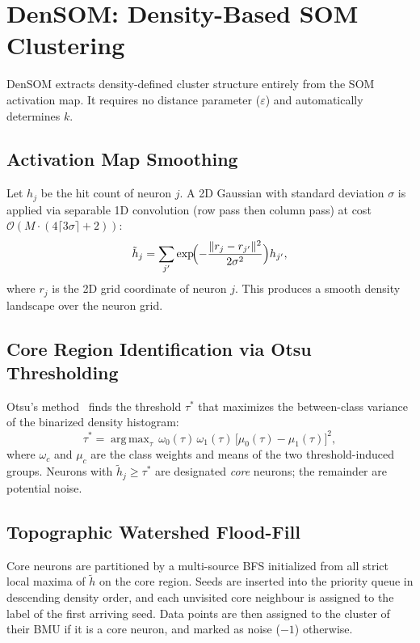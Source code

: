 \documentclass[journal]{IEEEtran}
\DeclareMathOperator*{\argmax}{arg\,max}
\begin{document}
\section{DenSOM: Density-Based SOM Clustering}
\label{sec:densom}

DenSOM extracts density-defined cluster structure entirely from the SOM activation map. It requires no distance parameter ($\varepsilon$) and automatically determines $k$.

\subsection{Activation Map Smoothing}

Let $h_j$ be the hit count of neuron $j$. A 2D Gaussian with standard deviation $\sigma$ is applied via separable 1D convolution (row pass then column pass) at cost $\mathcal{O}(M \cdot (4\lceil 3\sigma \rceil + 2))$:
\begin{equation}
  \tilde{h}_j = \sum_{j'} \exp\!\Bigl(-\frac{\|r_j - r_{j'}\|^2}{2\sigma^2}\Bigr) h_{j'},
\end{equation}
where $r_j$ is the 2D grid coordinate of neuron $j$. This produces a smooth density landscape over the neuron grid.

\subsection{Core Region Identification via Otsu Thresholding}

Otsu's method~\cite{otsu1979threshold} finds the threshold $\tau^*$ that maximizes the between-class variance of the binarized density histogram:
\begin{equation}
  \tau^* = \argmax_{\tau} \, \omega_0(\tau)\,\omega_1(\tau)\,\bigl[\mu_0(\tau) - \mu_1(\tau)\bigr]^2,
\end{equation}
where $\omega_c$ and $\mu_c$ are the class weights and means of the two threshold-induced groups. Neurons with $\tilde{h}_j \ge \tau^*$ are designated \textit{core} neurons; the remainder are potential noise.

\subsection{Topographic Watershed Flood-Fill}

Core neurons are partitioned by a multi-source BFS initialized from all strict local maxima of $\tilde{h}$ on the core region. Seeds are inserted into the priority queue in descending density order, and each unvisited core neighbour is assigned to the label of the first arriving seed. Data points are then assigned to the cluster of their BMU if it is a core neuron, and marked as noise ($-1$) otherwise.
\end{document}
